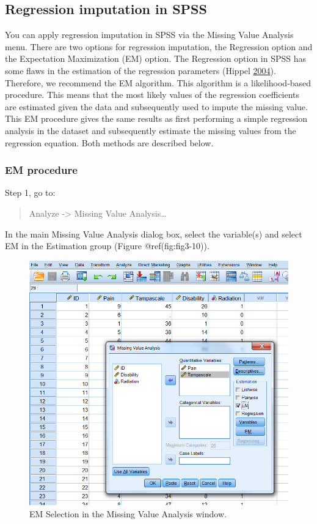 \documentclass[
]{book}
\begin{document}
\hypertarget{regression-imputation-in-spss}{%
\subsection{Regression imputation in
SPSS}\label{regression-imputation-in-spss}}

You can apply regression imputation in SPSS via the Missing Value
Analysis menu. There are two options for regression imputation, the
Regression option and the Expectation Maximization (EM) option. The
Regression option in SPSS has some flaws in the estimation of the
regression parameters (Hippel \protect\hyperlink{ref-hippel2004}{2004}).
Therefore, we recommend the EM algorithm. This algorithm is a
likelihood-based procedure. This means that the most likely values of
the regression coefficients are estimated given the data and
subsequently used to impute the missing value. This EM procedure gives
the same results as first performing a simple regression analysis in the
dataset and subsequently estimate the missing values from the regression
equation. Both methods are described below.

\hypertarget{em-procedure}{%
\subsubsection{EM procedure}\label{em-procedure}}

Step 1, go to:

\begin{quote}
Analyze -\textgreater{} Missing Value Analysis\ldots{}
\end{quote}

In the main Missing Value Analysis dialog box, select the variable(s)
and select EM in the Estimation group (Figure @ref(fig:fig3-10)).

\begin{figure}

{\centering \includegraphics[width=0.7\linewidth]{images/fig3.10} 

}

\caption{EM Selection in the Missing Value Analysis window.}\label{fig:fig3-10}
\end{figure}
\end{document}
